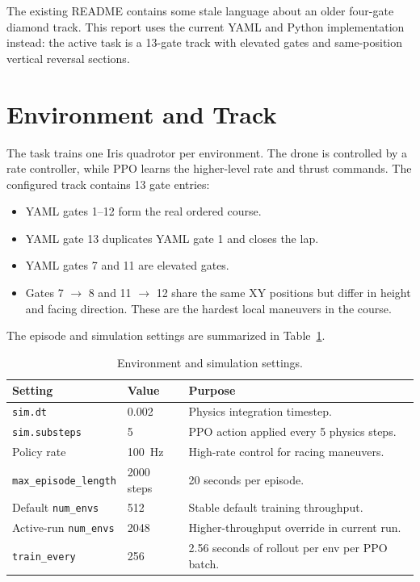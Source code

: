 \documentclass[11pt]{article}
\begin{document}
The existing README contains some stale language about an older four-gate
diamond track. This report uses the current YAML and Python implementation
instead: the active task is a 13-gate track with elevated gates and
same-position vertical reversal sections.

\section{Environment and Track}

The task trains one Iris quadrotor per environment. The drone is controlled by a
rate controller, while PPO learns the higher-level rate and thrust commands.
The configured track contains 13 gate entries:

\begin{itemize}
  \item YAML gates 1--12 form the real ordered course.
  \item YAML gate 13 duplicates YAML gate 1 and closes the lap.
  \item YAML gates 7 and 11 are elevated gates.
  \item Gates 7 $\rightarrow$ 8 and 11 $\rightarrow$ 12 share the same XY
  positions but differ in height and facing direction. These are the hardest
  local maneuvers in the course.
\end{itemize}

The episode and simulation settings are summarized in
Table~\ref{tab:env-settings}.

\begin{table}[H]
\centering
\caption{Environment and simulation settings.}
\label{tab:env-settings}
\begin{tabular}{lll}
\toprule
\textbf{Setting} & \textbf{Value} & \textbf{Purpose} \\
\midrule
\texttt{sim.dt} & 0.002 & Physics integration timestep. \\
\texttt{sim.substeps} & 5 & PPO action applied every 5 physics steps. \\
Policy rate & \SI{100}{Hz} & High-rate control for racing maneuvers. \\
\texttt{max\_episode\_length} & 2000 steps & 20 seconds per episode. \\
Default \texttt{num\_envs} & 512 & Stable default training throughput. \\
Active-run \texttt{num\_envs} & 2048 & Higher-throughput override in current run. \\
\texttt{train\_every} & 256 & 2.56 seconds of rollout per env per PPO batch. \\
\bottomrule
\end{tabular}
\end{table}
\end{document}

